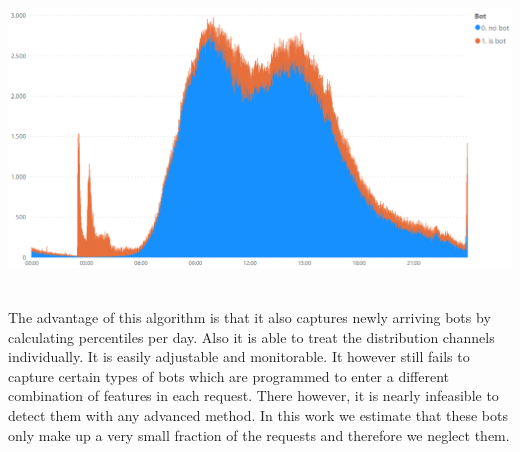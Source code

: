 \documentclass[12pt,titlepage]{article}
\begin{document}
\centerline{\includegraphics[height=8cm]{bots_day_time.png}}

The advantage of this algorithm is that it also captures newly arriving bots by calculating percentiles per day. Also it is able to treat the distribution channels individually. It is easily adjustable and monitorable. It however still fails to capture certain types of bots which are programmed to enter a different combination of features in each request. There however, it is nearly infeasible to detect them with any advanced method. In this work we estimate that these bots only make up a very small fraction of the requests and therefore we neglect them. \\
\end{document}
